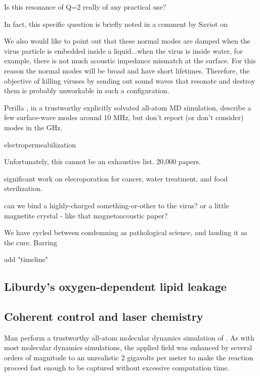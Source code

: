 \documentclass[paper.tex]{subfiles}
\begin{document}
\begin{multicols}{1}
Is this resonance of Q=2 really of any practical use?


In fact, this specific question is briefly noted in a comment by Saviot \cite{Comment2004} on 


\begin{fquote}
	We also would like to point out that these normal modes are damped when the virus particle is embedded inside a liquid...when the virus is inside water, for example, there is not much acoustic impedance mismatch at the surface. For this reason the normal modes will be broad and have short lifetimes. Therefore, the objective of killing viruses by sending out sound waves that resonate and destroy them is probably unworkable in such a configuration.	
\end{fquote}




Perilla \cite{}, in a trustworthy explicitly solvated all-atom MD simulation, describe a few surface-wave modes around 10 MHz, but don't report (or don't consider) modes in the GHz.




electropermeabilization




Unfortunately, this cannot be an exhaustive list. 20,000 papers.

significant work on elecroporation for cancer, water treatment, and food sterilization.


can we bind a highly-charged something-or-other to the virus?
or a little magnetite crystal - like that magnetoacoustic paper?


We have cycled between condemning as pathological science, and lauding it as the cure. Barring 


add "timeline"



\subsection{Liburdy's oxygen-dependent lipid leakage}



\subsection{Coherent control and laser chemistry}



Man \cite{Picosecond2016b} perform a trustworthy all-atom molecular dynamics simulation of . As with most molecular dynamics simulations, the applied field was enhanced by several orders of magnitude to an unrealistic 2 gigavolts per meter to make the reaction proceed fast enough to be captured without excessive computation time.




\end{multicols}
\end{document}
